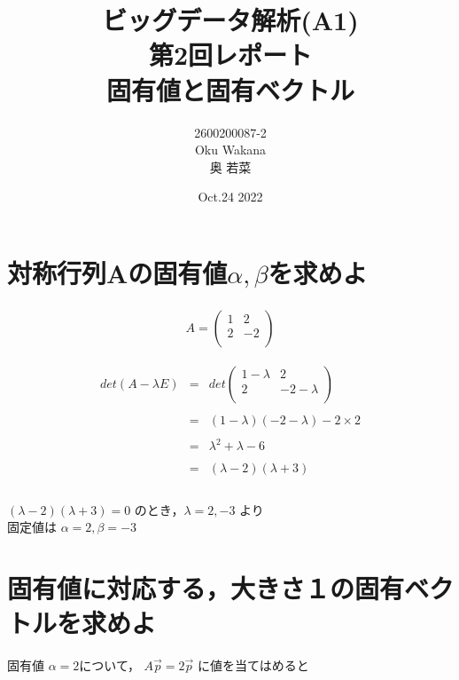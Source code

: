 \documentclass[dvipdfmx,autodetect-engine,titlepage]{jsarticle}
\title{ビッグデータ解析(A1)\\
第2回レポート\\
固有値と固有ベクトル\\
}
\author{2600200087-2\\Oku Wakana\\奥 若菜}
\date{Oct.24 2022}
\begin{document}
\maketitle

\section{対称行列Aの固有値\begin{math}\alpha ,\beta \end{math}を求めよ}
\begin{eqnarray*}
  A =
\begin{pmatrix}
  1 & 2 \\
  2 & -2 \\
\end{pmatrix}
\end{eqnarray*}

\begin{eqnarray*}
det(A -\lambda E) 
&=& det 
\begin{pmatrix}
  1-\lambda  & 2 \\
  2 & -2-\lambda  \\
\end{pmatrix} \\\\
&=& (1-\lambda )(-2-\lambda )-2 \times 2 \\\\
&=& \lambda ^2 + \lambda  - 6 \\\\
&=& (\lambda -2)(\lambda +3) \\\\
\end{eqnarray*}

\begin{math}
  (\lambda -2)(\lambda +3) = 0
\end{math}
のとき，\begin{math}
  \lambda = 2,-3 
\end{math} より　\\

固定値は \begin{math}
  \alpha = 2, \beta = -3
 \end{math} \\


\section{固有値に対応する，大きさ１の固有ベクトルを求めよ}
固有値 \begin{math}
  \alpha = 2
\end{math}について，
\begin{math}
A \overrightarrow{p} = 2 \overrightarrow{p} 
\end{math} に値を当てはめると
\end{document}
